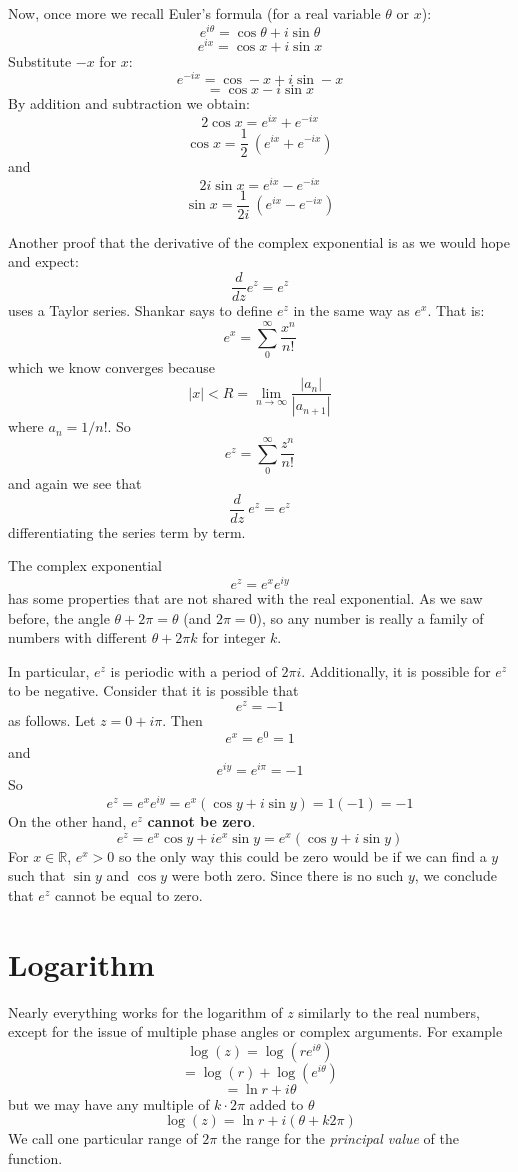 \documentclass[11pt, oneside]{article}   	%
\begin{document}
Now, once more we recall Euler's formula (for a real variable $\theta$ or $x$):
\[ e^{i \theta} = \cos \theta + i \sin \theta \]
\[ e^{i x} = \cos x + i \sin x \]
Substitute $-x$ for $x$:
\[ e^{-i x} = \cos -x + i \sin -x \]
\[ = \cos x - i \sin x \]
By addition and subtraction we obtain:
\[ 2 \cos x = e^{i x} + e^{-i x} \]
\[ \cos x = \frac{1}{2} \ (e^{i x} + e^{-i x}) \]
and
\[ 2i \sin x = e^{i x} - e^{-i x} \]
\[ \sin x = \frac{1}{2i} \ (e^{i x} - e^{-i x}) \]

Another proof that the derivative of the complex exponential is as we would hope and expect:
\[ \frac{d}{dz} e^z = e^z \]
uses a Taylor series.  Shankar says to define $e^z$ in the same way as $e^x$.  That is:
\[ e^x = \sum_0^{\infty} \frac{x^n}{n!} \]
which we know converges because
\[ |x| < R = \lim_{n \rightarrow \infty} \frac{|a_n|}{|a_{n+1}|} \]
where $a_n = 1/n!$.  So
\[ e^z = \sum_0^{\infty} \frac{z^n}{n!} \]
and again we see that 
\[ \frac{d}{dz} \ e^z = e^z \]
differentiating the series term by term.

The complex exponential 
\[ e^z = e^x e^{iy} \]
has some properties that are not shared with the real exponential.  As we saw before, the angle $\theta + 2 \pi = \theta$ (and $2 \pi = 0$), so any number is really a family of numbers with different $\theta + 2 \pi k$ for integer $k$.

In particular, $e^z$ is periodic with a period of $2 \pi i$.  Additionally, it is possible for $e^z$ to be negative.  Consider that it is possible that
\[ e^z = -1 \]
as follows.  Let $z = 0 + i\pi$.  Then 
\[ e^x = e^0 = 1 \]
and
\[ e^{iy} = e^{i\pi} = -1 \]
So
\[ e^z = e^x e^{iy} = e^x(\cos y + i \sin y) = 1 (-1) = -1 \]
On the other hand, $e^z$ \textbf{cannot be zero}.
\[ e^z = e^x \cos y + i e^x \sin y = e^x(\cos y + i \sin y) \]
For $x \in \mathbb{R}$, $e^x > 0$ so the only way this could be zero would be if we can find a $y$ such that $\sin y$ and $\cos y$ were both zero.  Since there is no such $y$, we conclude that $e^z$ cannot be equal to zero.

\section{Logarithm}
Nearly everything works for the logarithm of $z$ similarly to the real numbers, except for the issue of multiple phase angles or complex arguments.  For example
\[ \log(z) = \log(re^{i\theta}) \]
\[ = \log(r) + \log(e^{i\theta}) \]
\[ = \ln r + i \theta \]
but we may have any multiple of $k \cdot 2 \pi$ added to $\theta$
\[ \log(z) = \ln r + i (\theta + k2 \pi) \]
We call one particular range of $2 \pi$ the range for the \emph{principal value} of the function.  
\end{document}
